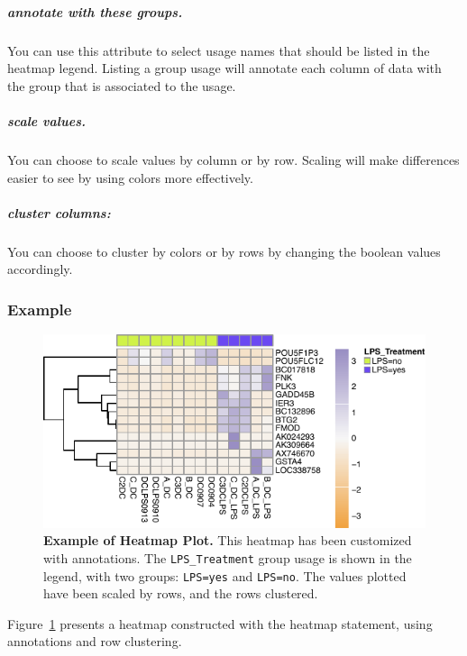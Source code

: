 \subparagraph{\textbf{annotate with these groups.}} You can use this attribute to select usage names that should be listed in the heatmap legend. Listing a group usage will annotate each column of data with the group that is associated to the usage.
\subparagraph{\textbf{scale values.}} You can choose to scale values by column or by row. Scaling will make differences easier to see by using colors more effectively.
\subparagraph{\textbf{cluster columns:}} You can choose to cluster by colors or by rows by changing the boolean values accordingly.

\subsubsection{Example}

\begin{figure}[h!tbp]
  \centering
  \includegraphics[width=\figWidthWide]{figures/heatmap_Example.pdf}
\caption[Example of Heatmap Plot.]{\textbf{Example of Heatmap Plot.} This heatmap has been customized with annotations. The \texttt{LPS\_Treatment} group usage is shown in the legend, with two groups: \texttt{LPS=yes} and \texttt{LPS=no}. The values plotted have been scaled by rows, and the rows clustered. }
\label{fig:ExampleHeatmapPlot}
\end{figure}

Figure~\ref{fig:ExampleHeatmapPlot} presents a heatmap constructed with the heatmap statement, using annotations and row clustering. 




  
